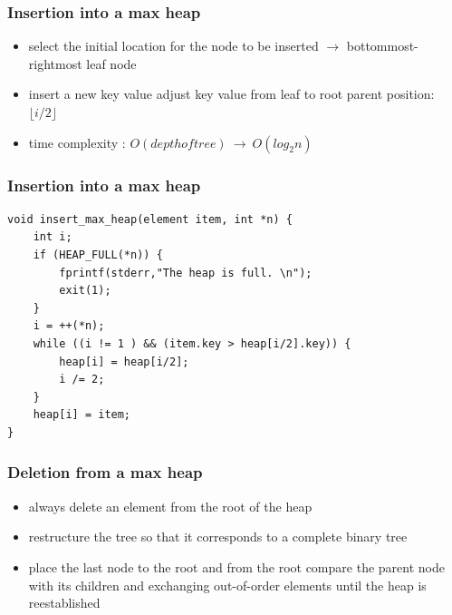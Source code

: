 \documentclass[newPxFont,sthlmFooter,nooffset]{beamer}
\begin{document}
\begin{frame}[t]
  \frametitle{Insertion into a max heap}
  \begin{itemize}
  \item select the initial location for the node to be inserted $\rightarrow$
    bottommost-rightmost leaf node
  \item insert a new key value adjust key
    value from leaf to root parent position: $\lfloor i/2 \rfloor$
  \item time complexity :
    $O(depth of tree) ~\rightarrow~ O(log_2n)$
  \end{itemize}
\end{frame}


\begin{frame}[t, fragile]
  \frametitle{Insertion into a max heap}
  \begin{lstlisting}
void insert_max_heap(element item, int *n) { 
    int i;
    if (HEAP_FULL(*n)) {
        fprintf(stderr,"The heap is full. \n"); 
        exit(1);
    }
    i = ++(*n);
    while ((i != 1 ) && (item.key > heap[i/2].key)) {
        heap[i] = heap[i/2]; 
        i /= 2;
    }
    heap[i] = item;     
}
  \end{lstlisting}
\end{frame}


\begin{frame}[t]
  \frametitle{Deletion from a max heap}
  \begin{itemize}
  \item always delete an element from the root of the heap
  \item restructure the tree so that it corresponds to a complete binary tree
  \item place the last node to the root and from the root compare the parent node with its children and exchanging out-of-order elements until the heap is reestablished
  \end{itemize}
\end{frame}
\end{document}
